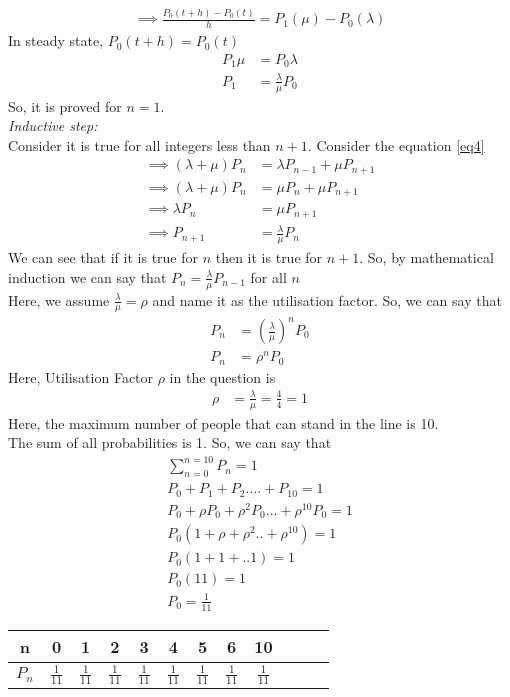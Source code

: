 \documentclass[journal,12pt,twocolumn]{IEEEtran}
\begin{document}
\begin{align}
    \implies \frac{P_0(t+h)-P_0(t)}{h}=P_1(\mu)-P_0(\lambda)
\end{align}
In steady state, $P_0(t+h)=P_0(t)$
\begin{align}
    P_1 \mu &=P_0 \lambda\\
    P_1&= \frac{\lambda}{\mu} P_0
\end{align}
So, it is proved for $n=1$.\\
\textit{Inductive step:}\\
Consider it is true for all integers less than $n+1$.
Consider the equation \eqref{eq4}
\begin{align}
    \implies (\lambda + \mu)P_n&=\lambda P_{n-1} + \mu P_{n+1}\\
    \implies (\lambda + \mu)P_n&= \mu P_n + \mu P_{n+1}\\
    \implies \lambda P_n &= \mu P_{n+1}\\
    \implies P_{n+1}&=\frac{\lambda}{\mu}P_n
\end{align}
We can see that if it is true for $n$ then it is true for $n+1$. So, by mathematical induction we can say that $P_n=\frac{\lambda}{\mu}P_{n-1}$ for all $n$ \\
Here, we assume $\frac{\lambda}{\mu}=\rho$ and name it as the utilisation factor.
So, we can say that 
\begin{align}
    P_n &= \left(\frac{\lambda}{\mu}\right)^n P_0\\
    P_n &= \rho^n P_0
\end{align}
Here, Utilisation Factor $\rho$ in the question is
\begin{align}
    \rho&=\frac{\lambda}{\mu}=\frac{4}{4}=1
\end{align}
Here, the maximum number of people that can stand in the line is 10.\\
The sum of all probabilities is 1. So, we can say that
\begin{align}
    \sum_{n=0}^{n=10}P_{n}=1\\
    P_{0}+P_{1}+P_{2}....+P_{10}=1\\
    P_{0}+\rho P_{0}+\rho^2P_{0}...+\rho^{10}P_{0}=1\\
    P_{0}(1+\rho+\rho^2..+\rho^{10})=1\\
    P_{0}(1+1+..1)=1\\
    P_{0}(11)=1\\
    P_{0}=\frac{1}{11}
\end{align}
\begin{table}[h!]
    \centering
    \begin{tabular}{|c|c|c|c|c|c|c|c|c|c|c|c|}
        \hline
        n & 0 & 1 & 2 & 3 & 4 & 5 & 6 & 10\\
        \hline
        $P_n$ & $\frac{1}{11}$& $\frac{1}{11}$ & $\frac{1}{11}$& $\frac{1}{11}$ & $\frac{1}{11}$& $\frac{1}{11}$ & $\frac{1}{11}$&  $\frac{1}{11}$\\
        \hline
    \end{tabular}
    \label{tab:my_label}
\end{table}
\end{document}
